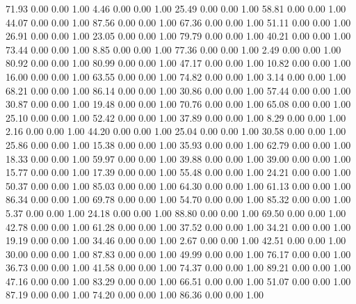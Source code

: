    71.93   0.00   0.00   1.00
    4.46   0.00   0.00   1.00
   25.49   0.00   0.00   1.00
   58.81   0.00   0.00   1.00
   44.07   0.00   0.00   1.00
   87.56   0.00   0.00   1.00
   67.36   0.00   0.00   1.00
   51.11   0.00   0.00   1.00
   26.91   0.00   0.00   1.00
   23.05   0.00   0.00   1.00
   79.79   0.00   0.00   1.00
   40.21   0.00   0.00   1.00
   73.44   0.00   0.00   1.00
    8.85   0.00   0.00   1.00
   77.36   0.00   0.00   1.00
    2.49   0.00   0.00   1.00
   80.92   0.00   0.00   1.00
   80.99   0.00   0.00   1.00
   47.17   0.00   0.00   1.00
   10.82   0.00   0.00   1.00
   16.00   0.00   0.00   1.00
   63.55   0.00   0.00   1.00
   74.82   0.00   0.00   1.00
    3.14   0.00   0.00   1.00
   68.21   0.00   0.00   1.00
   86.14   0.00   0.00   1.00
   30.86   0.00   0.00   1.00
   57.44   0.00   0.00   1.00
   30.87   0.00   0.00   1.00
   19.48   0.00   0.00   1.00
   70.76   0.00   0.00   1.00
   65.08   0.00   0.00   1.00
   25.10   0.00   0.00   1.00
   52.42   0.00   0.00   1.00
   37.89   0.00   0.00   1.00
    8.29   0.00   0.00   1.00
    2.16   0.00   0.00   1.00
   44.20   0.00   0.00   1.00
   25.04   0.00   0.00   1.00
   30.58   0.00   0.00   1.00
   25.86   0.00   0.00   1.00
   15.38   0.00   0.00   1.00
   35.93   0.00   0.00   1.00
   62.79   0.00   0.00   1.00
   18.33   0.00   0.00   1.00
   59.97   0.00   0.00   1.00
   39.88   0.00   0.00   1.00
   39.00   0.00   0.00   1.00
   15.77   0.00   0.00   1.00
   17.39   0.00   0.00   1.00
   55.48   0.00   0.00   1.00
   24.21   0.00   0.00   1.00
   50.37   0.00   0.00   1.00
   85.03   0.00   0.00   1.00
   64.30   0.00   0.00   1.00
   61.13   0.00   0.00   1.00
   86.34   0.00   0.00   1.00
   69.78   0.00   0.00   1.00
   54.70   0.00   0.00   1.00
   85.32   0.00   0.00   1.00
    5.37   0.00   0.00   1.00
   24.18   0.00   0.00   1.00
   88.80   0.00   0.00   1.00
   69.50   0.00   0.00   1.00
   42.78   0.00   0.00   1.00
   61.28   0.00   0.00   1.00
   37.52   0.00   0.00   1.00
   34.21   0.00   0.00   1.00
   19.19   0.00   0.00   1.00
   34.46   0.00   0.00   1.00
    2.67   0.00   0.00   1.00
   42.51   0.00   0.00   1.00
   30.00   0.00   0.00   1.00
   87.83   0.00   0.00   1.00
   49.99   0.00   0.00   1.00
   76.17   0.00   0.00   1.00
   36.73   0.00   0.00   1.00
   41.58   0.00   0.00   1.00
   74.37   0.00   0.00   1.00
   89.21   0.00   0.00   1.00
   47.16   0.00   0.00   1.00
   83.29   0.00   0.00   1.00
   66.51   0.00   0.00   1.00
   51.07   0.00   0.00   1.00
   87.19   0.00   0.00   1.00
   74.20   0.00   0.00   1.00
   86.36   0.00   0.00   1.00
